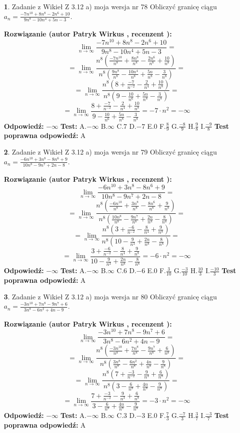 \documentclass[12pt, a4paper]{article}
\theoremstyle{definition} %
\newtheorem{zad}{}
\newcommand{\zadStart}[1]{\begin{zad}#1\newline}
\newcommand{\zadStop}{\end{zad}}
\newcommand{\rozwStart}[2]{\noindent \textbf{Rozwiązanie (autor #1 , recenzent #2): }\newline}
\newcommand{\rozwStop}{\newline}
\newcommand{\odpStart}{\noindent \textbf{Odpowiedź:}\newline}
\newcommand{\odpStop}{\newline}
\newcommand{\testStart}{\noindent \textbf{Test:}\newline}
\newcommand{\testStop}{\newline}
\newcommand{\kluczStart}{\noindent \textbf{Test poprawna odpowiedź:}\newline}
\newcommand{\kluczStop}{\newline}
\begin{document}
\zadStart{Zadanie z Wikieł Z 3.12 a) moja wersja nr 78}
Obliczyć granicę ciągu $a_{n}=\frac{-7n^{10}+8n^{8}-2n^{6}+10}{9n^{8}-10n^{4}+5n-3}$.
\zadStop
\rozwStart{Patryk Wirkus}{}
$$\lim\limits_{n\to\infty}\frac{-7n^{10}+8n^{8}-2n^{6}+10}{9n^{8}-10n^{4}+5n-3}=$$
$$=\lim\limits_{n\to\infty}\frac{n^{8}\left(\frac{-7n^{10}}{n^{8}}+\frac{8n^{8}}{n^{8}}-\frac{2n^{6}}{n^{8}}+\frac{10}{n^{8}}\right)}{n^{8}\left(\frac{9n^{8}}{n^{8}}-\frac{10n^{4}}{n^{8}}+\frac{5n}{n^{8}}-\frac{3}{n^{8}}\right)}=$$
$$=\lim\limits_{n\to\infty}\frac{n^{8}\left(8+\frac{-7}{n^{-2}}-\frac{2}{n^{4}}+\frac{10}{n^{8}}\right)}
{n^{8}\left(9-\frac{10}{n^{6}}+\frac{5n}{n^{8}}-\frac{3}{n^{8}}\right)}=$$
$$=\lim\limits_{n\to\infty}\frac{8+\frac{-7}{n^{-2}}-\frac{2}{n^{4}}+\frac{10}{n^{8}}}{9-\frac{10}{n^{6}}+\frac{5n}{n^{8}}-\frac{3}{n^{8}}}=-7\cdot n^{2} = -\infty$$
\rozwStop
\odpStart
$-\infty$
\odpStop
\testStart
A.$-\infty$
B.$\infty$
C.$7$
D.$-7$
E.$0$
F.$\frac{8}{9}$
G.$\frac{-8}{9}$
H.$\frac{9}{8}$
I.$\frac{-9}{8}$
\testStop
\kluczStart
A
\kluczStop



\zadStart{Zadanie z Wikieł Z 3.12 a) moja wersja nr 79}
Obliczyć granicę ciągu $a_{n}=\frac{-6n^{10}+3n^{8}-8n^{6}+9}{10n^{8}-9n^{7}+2n-8}$.
\zadStop
\rozwStart{Patryk Wirkus}{}
$$\lim\limits_{n\to\infty}\frac{-6n^{10}+3n^{8}-8n^{6}+9}{10n^{8}-9n^{7}+2n-8}=$$
$$=\lim\limits_{n\to\infty}\frac{n^{8}\left(\frac{-6n^{10}}{n^{8}}+\frac{3n^{8}}{n^{8}}-\frac{8n^{6}}{n^{8}}+\frac{9}{n^{8}}\right)}{n^{8}\left(\frac{10n^{8}}{n^{8}}-\frac{9n^{7}}{n^{8}}+\frac{2n}{n^{8}}-\frac{8}{n^{8}}\right)}=$$
$$=\lim\limits_{n\to\infty}\frac{n^{8}\left(3+\frac{-6}{n^{-2}}-\frac{8}{n^{4}}+\frac{9}{n^{8}}\right)}
{n^{8}\left(10-\frac{9}{n^{3}}+\frac{2n}{n^{8}}-\frac{8}{n^{8}}\right)}=$$
$$=\lim\limits_{n\to\infty}\frac{3+\frac{-6}{n^{-2}}-\frac{8}{n^{4}}+\frac{9}{n^{8}}}{10-\frac{9}{n^{3}}+\frac{2n}{n^{8}}-\frac{8}{n^{8}}}=-6\cdot n^{2} = -\infty$$
\rozwStop
\odpStart
$-\infty$
\odpStop
\testStart
A.$-\infty$
B.$\infty$
C.$6$
D.$-6$
E.$0$
F.$\frac{3}{10}$
G.$\frac{-3}{10}$
H.$\frac{10}{3}$
I.$\frac{-10}{3}$
\testStop
\kluczStart
A
\kluczStop



\zadStart{Zadanie z Wikieł Z 3.12 a) moja wersja nr 80}
Obliczyć granicę ciągu $a_{n}=\frac{-3n^{10}+7n^{8}-9n^{7}+6}{3n^{8}-6n^{2}+4n-9}$.
\zadStop
\rozwStart{Patryk Wirkus}{}
$$\lim\limits_{n\to\infty}\frac{-3n^{10}+7n^{8}-9n^{7}+6}{3n^{8}-6n^{2}+4n-9}=$$
$$=\lim\limits_{n\to\infty}\frac{n^{8}\left(\frac{-3n^{10}}{n^{8}}+\frac{7n^{8}}{n^{8}}-\frac{9n^{7}}{n^{8}}+\frac{6}{n^{8}}\right)}{n^{8}\left(\frac{3n^{8}}{n^{8}}-\frac{6n^{2}}{n^{8}}+\frac{4n}{n^{8}}-\frac{9}{n^{8}}\right)}=$$
$$=\lim\limits_{n\to\infty}\frac{n^{8}\left(7+\frac{-3}{n^{-2}}-\frac{9}{n^{3}}+\frac{6}{n^{8}}\right)}
{n^{8}\left(3-\frac{6}{n^{8}}+\frac{4n}{n^{8}}-\frac{9}{n^{8}}\right)}=$$
$$=\lim\limits_{n\to\infty}\frac{7+\frac{-3}{n^{-2}}-\frac{9}{n^{3}}+\frac{6}{n^{8}}}{3-\frac{6}{n^{8}}+\frac{4n}{n^{8}}-\frac{9}{n^{8}}}=-3\cdot n^{2} = -\infty$$
\rozwStop
\odpStart
$-\infty$
\odpStop
\testStart
A.$-\infty$
B.$\infty$
C.$3$
D.$-3$
E.$0$
F.$\frac{7}{3}$
G.$\frac{-7}{3}$
H.$\frac{3}{7}$
I.$\frac{-3}{7}$
\testStop
\kluczStart
A
\kluczStop
\end{document}
